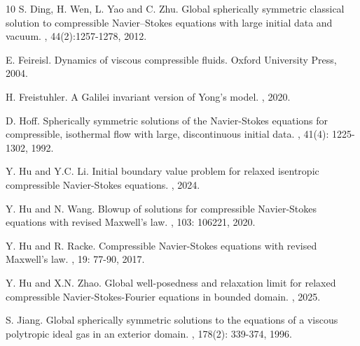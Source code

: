 \documentclass[10pt,reqno]{amsart}
\numberwithin{equation}{section}
\begin{document}
\begin{thebibliography}{10}
		S. Ding, H. Wen, L. Yao and C. Zhu. 
		\newblock Global spherically symmetric classical solution to compressible Navier–Stokes equations with large initial data and vacuum. 
		, 44(2):1257-1278, 2012.
		
		E. Feireisl. 
		\newblock Dynamics of viscous compressible fluids. Oxford University Press, 2004.
		
		H. Freistuhler.
		\newblock A Galilei invariant version of Yong's model.
		, 2020.
		
		D. Hoff.
		\newblock Spherically symmetric solutions of the Navier-Stokes equations for
		compressible, isothermal flow with large, discontinuous initial data.
		, 41(4): 1225-1302, 1992.
		
		Y. Hu and Y.C. Li.
		\newblock Initial boundary value problem for relaxed isentropic compressible Navier-Stokes equations.
		, 2024.
		
		Y. Hu and N. Wang.
		\newblock Blowup of solutions for compressible Navier-Stokes equations with revised Maxwell’s law. 
		, 103: 106221, 2020.
		
		Y. Hu and R. Racke.
		\newblock Compressible Navier-Stokes equations with revised Maxwell’s law.
		, 19: 77-90, 2017.
		
		Y. Hu and X.N. Zhao.
		\newblock Global well-posedness and relaxation limit for relaxed compressible Navier-Stokes-Fourier equations in bounded domain.
		, 2025.
		
		S. Jiang.
		\newblock Global spherically symmetric solutions to the equations of a viscous
		polytropic ideal gas in an exterior domain.
		, 178(2): 339-374, 1996.
		
		

\end{thebibliography}
\end{document}

